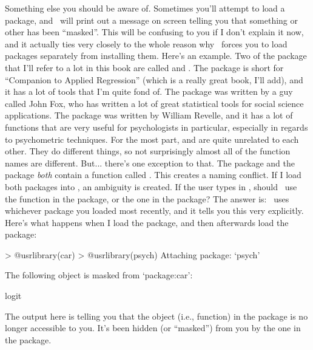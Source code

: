 Something else you should be aware of. Sometimes you'll attempt to load a package, and \R\ will print out a message on screen telling you that something or other has been ``masked''. This will be confusing to you if I don't explain it now, and it actually ties very closely to the whole reason why \R\ forces you to load packages separately from installing them. Here's an example. Two of the package that I'll refer to a lot in this book are called  and . The  package is short for ``Companion to Applied Regression'' (which is a really great book, I'll add), and it has a lot of tools that I'm quite fond of. The  package was written by a guy called John Fox, who has written a lot of great statistical tools for social science applications. The  package was written by William Revelle, and it has a lot of functions that are very useful for psychologists in particular, especially in regards to psychometric techniques. For the most part,  and  are quite unrelated to each other. They do different things, so not surprisingly almost all of the function names are different. But... there's one exception to that. The  package and the  package {\it both} contain a function called . This creates a naming conflict. If I load both packages into \R, an ambiguity is created. If the user types in , should \R\ use the  function in the  package, or the one in the  package? The answer is: \R\ uses whichever package you loaded most recently, and it tells you this very explicitly. Here's what happens when I load the  package, and then afterwards load the  package: 
\begin{rblock1}
> @usr{library(car)}
> @usr{library(psych)}
Attaching package: `psych'

The following object is masked from `package:car':

    logit
\end{rblock1}
The output here is telling you that the  object (i.e., function) in the  package is no longer accessible to you. It's been hidden (or ``masked'') from you by the one in the  package.


